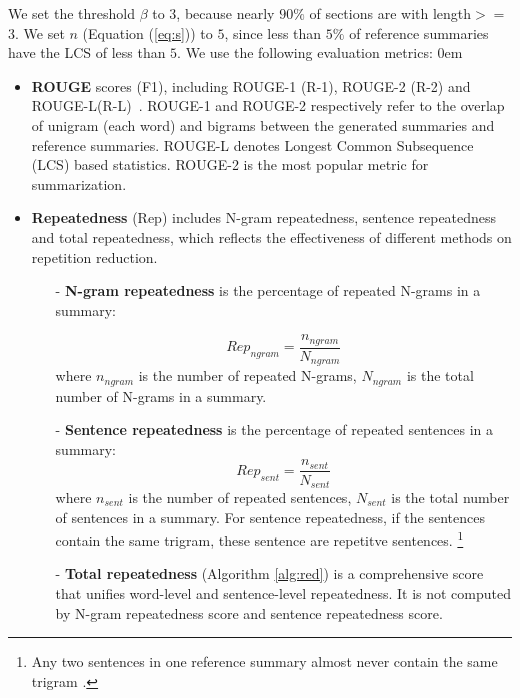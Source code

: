 We set the threshold $\beta$ to $3$, 
because nearly $90\%$ 
of sections are with length$>=$3.
We set $n$ (Equation (\ref{eq:s})) to $5$,
since less than $5\%$ of reference summaries have
the LCS of less than $5$.
We use the following evaluation metrics:
\itemsep0em
\begin{itemize}

\item \textbf{ROUGE} scores (F1), including ROUGE-1 (R-1), ROUGE-2 (R-2) and
ROUGE-L(R-L)~\citep{rouge-a-package-for-automatic-evaluation-of-summaries}.
ROUGE-1 and ROUGE-2 respectively refer to the overlap of unigram (each word) and bigrams between the generated summaries and reference summaries.
ROUGE-L denotes Longest Common Subsequence (LCS) based statistics.
ROUGE-2 is the most popular metric for summarization.

\item \textbf{Repeatedness} (Rep) 
includes N-gram repeatedness, sentence repeatedness
and total repeatedness,
which reflects the effectiveness of different methods on repetition reduction.
\begin{itemize}
\item[-] \textbf{N-gram repeatedness} is the percentage of repeated N-grams 
in a summary:

\begin{equation}
Rep_{ngram} = \frac{n_{ngram}}{N_{ngram}}
\end{equation}
where $n_{ngram}$ is the number of repeated N-grams, 
$N_{ngram}$ is the total number of N-grams in a summary.
\item[-] \textbf{Sentence repeatedness} is the percentage of repeated 
sentences in a summary:
\begin{equation}
Rep_{sent} = \frac{n_{sent}}{N_{sent}}
\end{equation}
where $n_{sent}$ is the number of repeated sentences, 
$N_{sent}$ is the total number of sentences in a summary.
For sentence repeatedness, if the sentences contain the same trigram,
these sentence are repetitve sentences.
\footnote{
Any two sentences in one reference summary almost never contain 
the same trigram \citep{PaulusXS17}.}
\item[-] 
\textbf{Total repeatedness} (Algorithm \ref{alg:red}) is a comprehensive score
that unifies word-level and sentence-level repeatedness.
It is not computed by N-gram repeatedness score 
and sentence repeatedness score.


\end{itemize}
\end{itemize}
